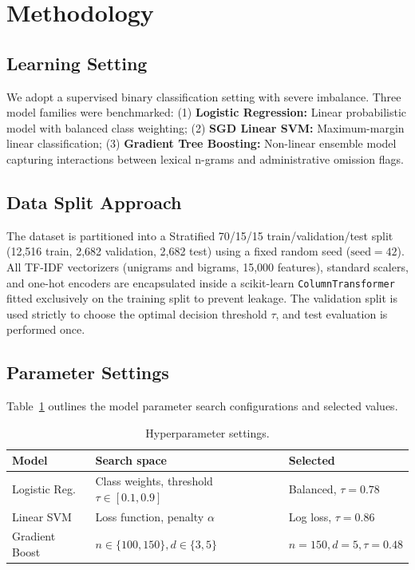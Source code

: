 \documentclass[conference]{IEEEtran}
\begin{document}
\section{Methodology}
\subsection{Learning Setting}
We adopt a supervised binary classification setting with severe imbalance. Three model families were benchmarked:
(1) \textbf{Logistic Regression:} Linear probabilistic model with balanced class weighting;
(2) \textbf{SGD Linear SVM:} Maximum-margin linear classification;
(3) \textbf{Gradient Tree Boosting:} Non-linear ensemble model capturing interactions between lexical n-grams and administrative omission flags.

\subsection{Data Split Approach}
The dataset is partitioned into a Stratified 70/15/15 train/validation/test split (12,516 train, 2,682 validation, 2,682 test) using a fixed random seed ($\text{seed} = 42$). All TF-IDF vectorizers (unigrams and bigrams, 15,000 features), standard scalers, and one-hot encoders are encapsulated inside a scikit-learn \texttt{ColumnTransformer} fitted exclusively on the training split to prevent leakage. The validation split is used strictly to choose the optimal decision threshold $\tau$, and test evaluation is performed once.

\subsection{Parameter Settings}
Table~\ref{tab:hyperparams} outlines the model parameter search configurations and selected values.

\begin{table}[htbp]
\caption{Hyperparameter settings.}
\label{tab:hyperparams}
\centering
\begin{tabular}{lll}
\toprule
\textbf{Model} & \textbf{Search space} & \textbf{Selected} \\
\midrule
Logistic Reg. & Class weights, threshold $\tau \in [0.1, 0.9]$ & Balanced, $\tau=0.78$ \\
Linear SVM & Loss function, penalty $\alpha$ & Log loss, $\tau=0.86$ \\
Gradient Boost & $n \in \{100, 150\}, d \in \{3, 5\}$ & $n=150, d=5, \tau=0.48$ \\
\bottomrule
\end{tabular}
\end{table}
\end{document}

